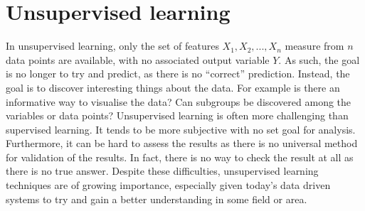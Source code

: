 \documentclass[CS5104-Notes.tex]{subfiles}
\begin{document}
\section{Unsupervised learning}
In unsupervised learning, only the set of features $X_{1}, X_{2}, ..., X_{n}$ measure from $n$ data points are available, with no associated output variable $Y$. As such, the goal is no longer to try and predict, as there is no ``correct'' prediction. Instead, the goal is to discover interesting things about the data. For example is there an informative way to visualise the data? Can subgroups be discovered among the variables or data points?
\n
Unsupervised learning is often more challenging than supervised learning. It tends to be more subjective with no set goal for analysis. Furthermore, it can be hard to assess the results as there is no universal method for validation of the results. In fact, there is no way to check the result at all as there is no true answer. Despite these difficulties, unsupervised learning techniques are of growing importance, especially given today's data driven systems to try and gain a better understanding in some field or area.
\end{document}
